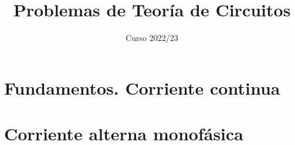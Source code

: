 \documentclass[oldfontcommands,a4paper]{memoir}
\begin{document}
\begin{titlingpage}

\title{Problemas de Teoría de Circuitos}

\author{}

\date{Curso 2022/23}

\maketitle


\end{titlingpage}

\frontmatter

\cleardoublepage{}

\tableofcontents*

\cleardoublepage{}

\mainmatter

\chapter{Fundamentos. Corriente continua}



\chapter{Corriente alterna monofásica}




% 


% 


\backmatter
\end{document}
